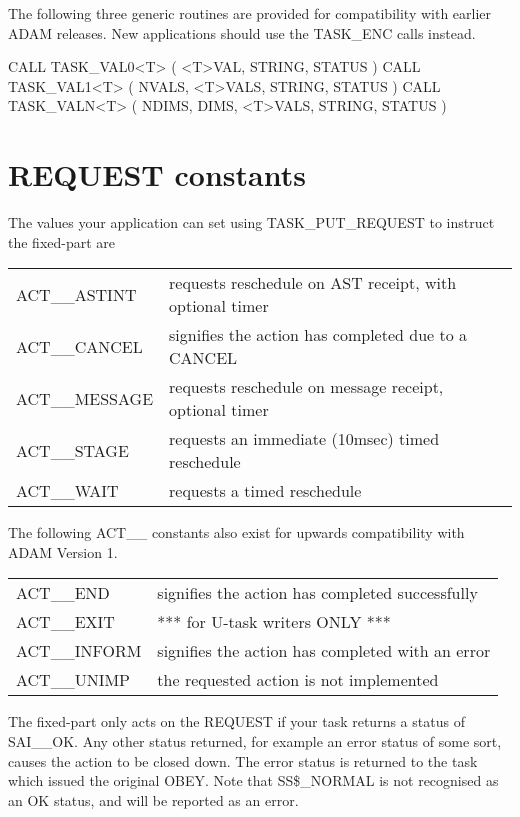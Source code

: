 \documentclass[twoside,11pt,nolof]{starlink}
\begin{document}
The following three generic routines are provided for compatibility with
earlier ADAM releases. New applications should use the TASK\_ENC calls
instead.

\begin{terminalv}
CALL TASK_VAL0<T> ( <T>VAL, STRING, STATUS )
CALL TASK_VAL1<T> ( NVALS, <T>VALS, STRING, STATUS )
CALL TASK_VALN<T> ( NDIMS, DIMS, <T>VALS, STRING, STATUS )
\end{terminalv}

\newpage

\section{REQUEST constants\label{request}}

The values your application can set using TASK\_PUT\_REQUEST to instruct
the fixed-part are

\begin{center}
\begin{tabular}{ll}
ACT\_\_ASTINT   &   requests reschedule on AST receipt, with optional timer \\
ACT\_\_CANCEL   &   signifies the action has completed due to a CANCEL \\
ACT\_\_MESSAGE  &   requests reschedule on message receipt, optional timer \\
ACT\_\_STAGE    &   requests an immediate (10msec) timed reschedule \\
ACT\_\_WAIT     &   requests a timed reschedule \\
\end{tabular}
\end{center}

The following ACT\_\_ constants also exist for upwards compatibility
with ADAM Version 1.
\begin{center}
\begin{tabular}{ll}
ACT\_\_END      &   signifies the action has completed successfully \\
ACT\_\_EXIT     &   *** for U-task writers ONLY *** \\
ACT\_\_INFORM   &   signifies the action has completed with an error \\
ACT\_\_UNIMP    &   the requested action is not implemented \\
\end{tabular}
\end{center}

The fixed-part only acts on the REQUEST if your task returns a status of
SAI\_\_OK. Any other status returned, for example an error status of
some sort, causes the action to be closed down. The error status is
returned to the task which issued the original OBEY. Note that
SS\$\_NORMAL is not recognised as an OK status, and will be reported as
an error.
\end{document}
